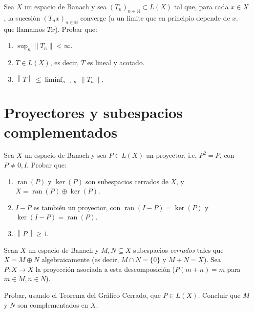 \documentclass{article}
\theoremstyle{definition}
\newcommand{\N}{\mathbb{N}}
\newcommand{\norm}[1]{\left\lVert #1 \right\rVert}       %
\newcommand{\ran}{\operatorname{ran}}
\newenvironment{ejercicio}[1]{\begin{trivlist}
\item[\hskip \labelsep {\bfseries Ejercicio}\hskip \labelsep {\bfseries #1.}]}{\end{trivlist}}
\begin{document}
\vspace{0.3cm}

\begin{ejercicio}{9}
    Sea \( X \) un espacio de Banach y sea \( (T_n)_{n \in \N} \subset L(X) \) tal que, para cada \( x \in X \), la sucesión \( (T_n x)_{n \in \N} \) converge (a un límite que en principio depende de \(x\), que llamamos \( Tx \)). Probar que:
    \begin{enumerate}
        \item \( \sup_n \norm{T_n} < \infty \).
        \item \( T \in L(X) \), es decir, \( T \) es lineal y acotado.
        \item \( \norm{T} \le \liminf_{n \to \infty} \norm{T_n} \).
    \end{enumerate}
\end{ejercicio}

\vspace{0.6cm}
\section{Proyectores y subespacios complementados}

\begin{ejercicio}{10}
    Sea \( X \) un espacio de Banach y sea \( P \in L(X) \) un proyector, i.e. \( P^2 = P \), con \( P \neq 0, I \). Probar que:
    \begin{enumerate}
        \item \( \ran(P) \) y \( \ker(P) \) son subespacios cerrados de \( X \), y \( X = \ran(P) \oplus \ker(P) \).
        \item \( I - P \) es también un proyector, con \( \ran(I-P) = \ker(P) \) y \( \ker(I-P) = \ran(P) \).
        \item \( \norm{P} \ge 1 \).
    \end{enumerate}
\end{ejercicio}

\vspace{0.3cm}

\begin{ejercicio}{11}
    Sean \( X \) un espacio de Banach y \( M, N \subseteq X \) subespacios \emph{cerrados} tales que \( X = M \oplus N \) algebraicamente (es decir, \( M \cap N = \{0\} \) y \( M + N = X \)). Sea \( P : X \to X \) la proyección asociada a esta descomposición (\( P(m+n) = m \) para \( m \in M, n \in N \)).

    Probar, usando el Teorema del Gráfico Cerrado, que \( P \in L(X) \). Concluir que \( M \) y \( N \) son complementados en \( X \).
\end{ejercicio}
\end{document}
